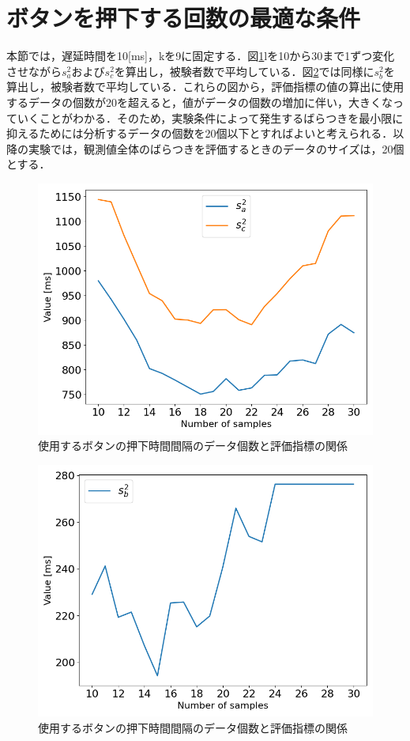 \section{ボタンを押下する回数の最適な条件}
本節では，遅延時間を10[ms]，kを9に固定する．図\ref{fig:NumberofSamples_Sa_Sc}lを10から30まで1ずつ変化させながら$s^2_{a}$および$s^2_{c}$を算出し，被験者数で平均している．図\ref{fig:Numberofsamples_Sb}では同様に$s^2_{b}$を算出し，被験者数で平均している．これらの図から，評価指標の値の算出に使用するデータの個数が20を超えると，値がデータの個数の増加に伴い，大きくなっていくことがわかる．そのため，実験条件によって発生するばらつきを最小限に抑えるためには分析するデータの個数を20個以下とすればよいと考えられる．以降の実験では，観測値全体のばらつきを評価するときのデータのサイズは，20個とする．
\begin{figure}[bt]
  \centering
  \includegraphics[scale=0.6]{figures/Yobi/Var/NumberOfSamples_Sa_Sc.png}
  \caption{使用するボタンの押下時間間隔のデータ個数と評価指標の関係}
  \label{fig:NumberofSamples_Sa_Sc}
\end{figure}
\begin{figure}[bt]
  \centering
  \includegraphics[scale=0.6]{figures/Yobi/Var/NumberOfSamples_Sb.png}
  \caption{使用するボタンの押下時間間隔のデータ個数と評価指標の関係}
  \label{fig:Numberofsamples_Sb}
\end{figure}

